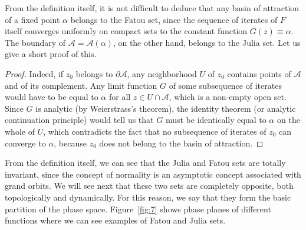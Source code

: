 \documentclass[12pt, a4paper]{article}
\begin{document}
From the definition itself, it is not difficult to deduce that any basin of
attraction of a fixed point $\alpha$ belongs to the Fatou set, since the
sequence of iterates of $F$ itself converges uniformly on compact sets to the
constant function $G(z)\equiv\alpha$. The boundary of
$\mathcal{A}=\mathcal{A}(\alpha)$, on the other hand, belongs to the Julia set.
Let us give a short proof of this.

\begin{proof}
Indeed, if $z_{0}$ belongs to $\partial\mathcal{A}$, any neighborhood $U$ of
$z_{0}$ contains points of $\mathcal{A}$ and of its complement. Any limit
function $G$ of some subsequence of iterates would have to be equal to $\alpha$
for all $z \in U \cap \mathcal{A}$, which is a non-empty open set. Since $G$ is
analytic (by Weierstrass's theorem), the identity theorem (or analytic
continuation principle) would tell us that $G$ must be identically equal to
$\alpha$ on the whole of $U$, which contradicts the fact that no subsequence of
iterates of $z_{0}$ can converge to $\alpha$, because $z_{0}$ does not belong to
the basin of attraction.
\end{proof}

From the definition itself, we can see that the Julia and Fatou sets are totally
invariant, since the concept of normality is an asymptotic concept associated
with grand orbits. We will see next that these two sets are completely opposite,
both topologically and dynamically. For this reason, we say that they form the
basic partition of the phase space. Figure~\ref{fig:7} shows phase planes of
different functions where we can see examples of Fatou and Julia sets.
\end{document}
